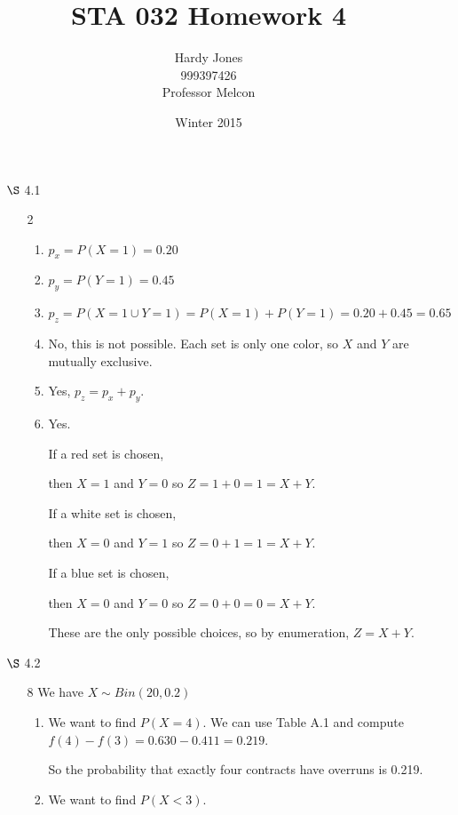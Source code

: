 \documentclass[12pt,letterpaper]{article}
\title{STA 032 Homework 4\vspace{-2ex}}
\author{Hardy Jones\\
        999397426\\
        Professor Melcon\vspace{-2ex}}
\date{Winter 2015}
\begin{document}
  \maketitle

  \begin{enumerate}
    \item [$\S$ 4.1]
      \begin{enumerate}
        \item [2]
          \begin{enumerate}[label=(\arabic*)]
            \item $p_x = P(X = 1) = 0.20$
            \item $p_y = P(Y = 1) = 0.45$
            \item $p_z = P(X = 1 \cup Y = 1) = P(X = 1) + P(Y = 1) = 0.20 + 0.45 = 0.65$
            \item
              No, this is not possible.
              Each set is only one color, so $X$ and $Y$ are mutually exclusive.
            \item
              Yes, $p_z = p_x + p_y$.
            \item
              Yes.

              If a red set is chosen,

              then $X = 1$ and $Y = 0$ so $Z = 1 + 0 = 1 = X + Y$.

              If a white set is chosen,

              then $X = 0$ and $Y = 1$ so $Z = 0 + 1 = 1 = X + Y$.

              If a blue set is chosen,

              then $X = 0$ and $Y = 0$ so $Z = 0 + 0 = 0 = X + Y$.

              These are the only possible choices,
              so by enumeration, $Z = X + Y$.
          \end{enumerate}
      \end{enumerate}
    \item [$\S$ 4.2]
      \begin{enumerate}
        \item [8]
          We have $X \sim Bin(20, 0.2)$
          \begin{enumerate}[label=(\arabic*)]
            \item
              We want to find $P(X = 4)$.
              We can use Table A.1 and compute $f(4) - f(3) = 0.630 - 0.411 = 0.219$.

              So the probability that exactly four contracts have overruns is 0.219.
            \item
              We want to find $P(X < 3)$.


\end{enumerate}
\end{enumerate}
\end{enumerate}
\end{document}
